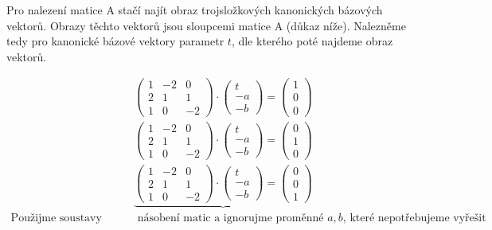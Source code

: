 \documentclass[12pt]{article}
\begin{document}
\begin{enumerate}
    Pro nalezení matice A stačí najít obraz trojsložkových kanonických bázových vektorů.
    Obrazy těchto vektorů jsou sloupcemi matice A (důkaz níže).
    Nalezněme tedy pro kanonické bázové vektory parametr $t$, dle kterého poté najdeme obraz vektorů.

    \begin{align*}
      &\left(\begin{array}{ccc} 1 & -2 & 0 \\ 2 & 1 & 1 \\ 1 & 0 & -2 \end{array}\right)
      \cdot \left(\begin{array}{c} t \\ -a \\ -b \end{array}\right) = \left(\begin{array}{c} 1 \\ 0 \\ 0 \end{array}\right)
      \\
      &\left(\begin{array}{ccc} 1 & -2 & 0 \\ 2 & 1 & 1 \\ 1 & 0 & -2 \end{array}\right)
      \cdot \left(\begin{array}{c} t \\ -a \\ -b \end{array}\right) = \left(\begin{array}{c} 0 \\ 1 \\ 0 \end{array}\right)
      \\
      &\underbrace{\left(\begin{array}{ccc} 1 & -2 & 0 \\ 2 & 1 & 1 \\ 1 & 0 & -2 \end{array}\right)
      \cdot \left(\begin{array}{c} t \\ -a \\ -b \end{array}\right) = \left(\begin{array}{c} 0 \\ 0 \\ 1 \end{array}\right)
      } \\
      \text{Použijme soustavy najednou pomocí}&\text{ násobení matic a ignorujme proměnné $a,b$, které nepotřebujeme vyřešit} \\

\end{align*}
\end{enumerate}
\end{document}
